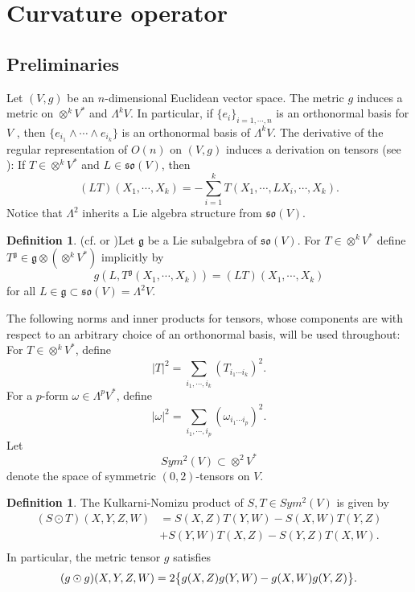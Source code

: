 \documentclass[12pt, twoside]{article}
\theoremstyle{definition}
\newtheorem{definition}[theorem]{Definition}
\numberwithin{equation}{section}
\def \La {\Lambda}
\def\w {\omega}
\begin{document}
\section{Curvature operator }
\subsection{Preliminaries }
Let $(V,g)$ be an $n$-dimensional Euclidean vector space. The metric $g$ induces a metric on $\otimes^{k}V^{\ast}$ and $\La^{k}V$. In particular, if $\{e_{i}\}_{i=1,\cdots,n}$ is an orthonormal basis for $V$ , then  $\{e_{i_{1}}\wedge\cdots\wedge e_{i_{k}} \}$ is an orthonormal basis of $\La^{k}V$. The derivative of the regular representation of $O(n)$ on $(V,g)$ induces a derivation on tensors (see \cite[Section 1.2]{PW21a}): If $T\in\otimes^{k}V^{\ast}$ and $L\in\mathfrak{so}(V)$, then
$$(LT)(X_{1},\cdots,X_{k})=-\sum_{i=1}^{k}T(X_{1},\cdots,LX_{i},\cdots,X_{k}).$$
Notice that  $\La^{2}$ inherits a Lie algebra structure from $\mathfrak{so}(V)$.
\begin{definition}(cf.\cite[Definition 1.2]{PW21a} or \cite{PW21b})\label{D1}
Let $\mathfrak{g}$ be a Lie subalgebra of $\mathfrak{so}(V)$. For $T\in\otimes^{k}V^{\ast}$ define $T^{\mathfrak{g}}\in\mathfrak{g}\otimes(\otimes^{k}V^{\ast})$ implicitly by
$$g(L,T^{\mathfrak{g}}(X_{1},\cdots,X_{k}))=(LT)(X_{1},\cdots,X_{k})$$
for all $L\in\mathfrak{g}\subset \mathfrak{so}(V)=\La^{2}V$.
\end{definition}
The following norms and inner products for tensors, whose components are with respect to an arbitrary choice of an orthonormal basis, will be used throughout:\\
For $T\in\otimes^{k}V^{\ast}$, define
$$|T|^{2}=\sum_{i_{1},\cdots,i_{k}}(T_{i_{1}\cdots i_{k} })^{2}.$$
For a $p$-form $\w\in\La^{p}V^{\ast}$, define
$$|\w|^{2}=\sum_{i_{1},\cdots,i_{p}}(\w_{i_{1}\cdots i_{p} })^{2}.$$
Let $$Sym^{2}(V)\subset\otimes^{2}V^{\ast}$$
denote the space of symmetric $(0,2)$-tensors on $V$.
\begin{definition}
	The Kulkarni-Nomizu product of $S,T \in Sym^{2}(V)$ is given by
	\begin{equation*}
	\begin{split}
	(S\odot T )(X,Y,Z,W)&=S(X,Z)T(Y,W)-S(X,W)T(Y,Z)\\
	&+S(Y,W)T(X,Z)-S(Y,Z)T(X,W).\\
	\end{split}
	\end{equation*}
In particular, the metric tensor $g$ satisfies
	$$(g\odot g )(X,Y,Z,W)=2\big{\{}g(X,Z)g(Y,W)-g(X,W)g(Y,Z)\big{\}}.$$
\end{definition}
\end{document}
